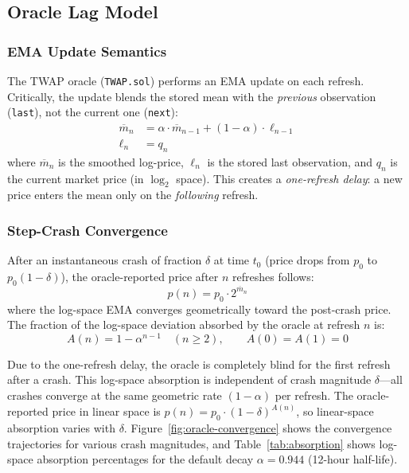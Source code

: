\documentclass[10pt,a4paper,twocolumn]{article}
\theoremstyle{definition}
\theoremstyle{plain}
\theoremstyle{remark}
\begin{document}
\subsection{Oracle Lag Model}
\label{sec:bd-oracle-lag}

\subsubsection{EMA Update Semantics}
\label{subsec:bd-ema}

The TWAP oracle (\texttt{TWAP.sol}) performs an EMA update on each refresh. Critically, the update blends the stored mean with the \emph{previous} observation (\texttt{last}), not the current one (\texttt{next}):
\begin{align}
\overline{m}_n &= \alpha \cdot \overline{m}_{n-1} + (1{-}\alpha) \cdot \ell_{n-1} \label{eq:ema-update} \\
\ell_n &= q_n \label{eq:last-update}
\end{align}
where $\overline{m}_n$ is the smoothed log-price, $\ell_n$ is the stored last observation, and $q_n$ is the current market price (in $\log_2$ space). This creates a \emph{one-refresh delay}: a new price enters the mean only on the \emph{following} refresh.

\subsubsection{Step-Crash Convergence}
\label{subsec:bd-step-crash}

After an instantaneous crash of fraction $\delta$ at time $t_0$ (price drops from $p_0$ to $p_0(1{-}\delta)$), the oracle-reported price after $n$ refreshes follows:
\begin{equation}
\label{eq:oracle-trajectory}
\hat{p}(n) = p_0 \cdot 2^{\overline{m}_n}
\end{equation}
where the log-space EMA converges geometrically toward the post-crash price. The fraction of the log-space deviation absorbed by the oracle at refresh $n$ is:
\begin{equation}
\label{eq:absorption}
A(n) = 1 - \alpha^{n-1} \quad (n \geq 2), \qquad A(0) = A(1) = 0
\end{equation}

Due to the one-refresh delay, the oracle is completely blind for the first refresh after a crash. This log-space absorption is independent of crash magnitude $\delta$---all crashes converge at the same geometric rate $(1{-}\alpha)$ per refresh. The oracle-reported price in linear space is $\hat{p}(n) = p_0 \cdot (1{-}\delta)^{A(n)}$, so linear-space absorption varies with $\delta$. Figure~\ref{fig:oracle-convergence} shows the convergence trajectories for various crash magnitudes, and Table~\ref{tab:absorption} shows log-space absorption percentages for the default decay $\alpha = 0.944$ (12-hour half-life).
\end{document}
